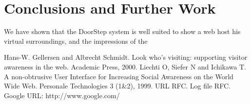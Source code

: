 \documentclass[a4paper]{danarticle}
\begin{document}
      
  \section{Conclusions and Further Work}
     We have shown that the DoorStep system is well suited to show a web host
     his virtual surroundings, and the impressions of the
  \begin{thebibliography}{99}
     Hans-W. Gellersen and Albrecht Schmidt.
    Look who's visiting: supporting visitor awareness in the web.
    Academic Press, 2000.
     Liechti O, Siefer N and Ichikawa T.
    A non-obtrusive User Interface for Increasing Social Awareness on the 
    World Wide Web. Personale Technologies 3 (1\&2), 1999.
     URL RFC.
     Log file RFC.
     Google URL: http://www.google.com/
  \end{thebibliography}
\end{document}
